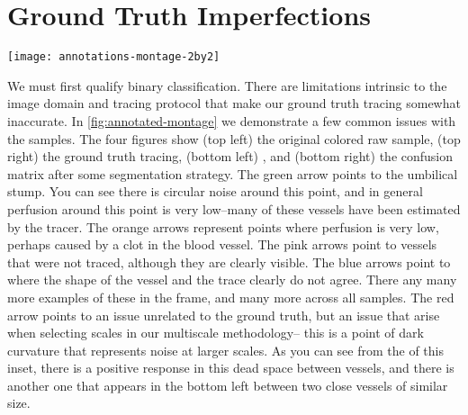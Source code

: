 

\section{Ground Truth Imperfections} \label{sec:NCS-dataset-issues}
\begin{sidewaysfigure}
	\texttt{[image: annotations-montage-2by2]}
	\caption{Issues with the ground truth manifesting in Frangi vesselness scores}
	\label{fig:annotated-montage}
\end{sidewaysfigure}

We must first qualify binary classification. There are limitations intrinsic to the image domain and tracing protocol that make our ground truth tracing somewhat inaccurate. In \cref{fig:annotated-montage} we demonstrate a few common issues with the samples. The four figures show (top left) the original colored raw sample, (top right) the ground truth tracing, (bottom left) \Vmax, and (bottom right) the confusion matrix after some segmentation strategy. %
The green arrow points to the umbilical stump. You can see there is circular noise around this point, and in general perfusion around this point is very low--many of these vessels have been estimated by the tracer. The orange arrows represent points where perfusion is very low, perhaps caused by a clot in the blood vessel. The pink arrows point to vessels that were not traced, although they are clearly visible. The blue arrows point to where the shape of the vessel and the trace clearly do not agree. There any many more examples of these in the frame, and many more across all samples.
The red arrow points to an issue unrelated to the ground truth, but an issue that arise when selecting scales in our multiscale methodology-- this is a point of dark curvature that represents noise at larger scales. As you can see from the \Vmax of this inset, there is a positive response in this dead space between vessels, and there is another one that appears in the bottom left between two close vessels of similar size.

